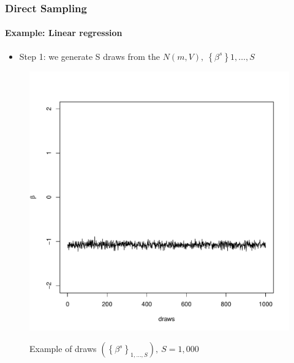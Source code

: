 \documentclass[
  shownotes,
  xcolor={svgnames},
  hyperref={colorlinks,citecolor=DarkBlue,linkcolor=DarkRed,urlcolor=DarkBlue}
  , aspectratio=169]{beamer}
\begin{document}
\begin{frame}[fragile]
\frametitle{Direct Sampling}  
\framesubtitle{Example: Linear regression}
\begin{itemize}
\item Step 1: we generate S draws from the $N\left( m,V \right),\ \left\{ \beta^{s} \right\} 1,\ldots,S$

\end{itemize}

\begin{figure}[H] \centering
  \centering
  \caption{Example of draws $\left( \left\{ \beta^{s} \right\}_{1,\ldots,S} \right),\ S = 1,000$}
  \includegraphics[scale=0.25]{figures/beta}
  \\
  \tiny 
\end{figure}

  
\end{frame}
\end{document}
